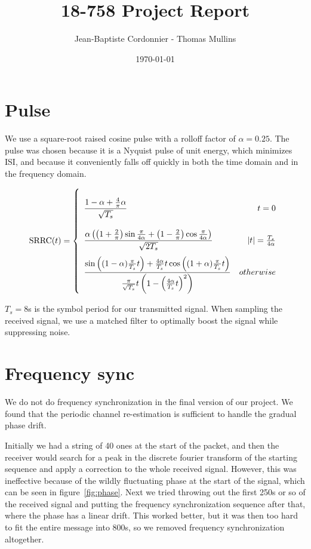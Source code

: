 \documentclass{article}
\begin{document}
\title{18-758 Project Report}
\author{Jean-Baptiste Cordonnier - Thomas Mullins}
\date{\today}
\maketitle


\section{Pulse}

We use a square-root raised cosine pulse with a rolloff factor of $\alpha =
0.25$. The pulse was chosen because it is a Nyquist pulse of unit energy, which
minimizes ISI, and because it conveniently falls off quickly in both the time
domain and in the frequency domain.

\[
  \text{SRRC}(t) = \left\{
    \def\arraystretch{3.2}
    \begin{array}{lr}
      \dfrac{1 - \alpha + \frac{4}{\pi}\alpha}{\sqrt{T_s}} & t = 0 \\
      \dfrac{\alpha \left(
        \left(1 + \frac{2}{\pi}\right) \sin{\frac{\pi}{4\alpha}} +
        \left(1 - \frac{2}{\pi}\right) \cos{\frac{\pi}{4\alpha}}
      \right)}{\sqrt{2T_s}} & |t| = \frac{T_s}{4\alpha} \\
      \dfrac{
        \sin{\left((1-\alpha)\frac{\pi}{T_s}t\right)} +
        \frac{4\alpha}{T_s}t\cos{\left((1+\alpha)\frac{\pi}{T_s}t\right)}
      }{
        \frac{\pi}{\sqrt{T_s}}t
        \left(1-\left(\frac{4\alpha}{T_s}t\right)^2\right)
      } & otherwise
    \end{array}
  \right.
\]

$T_s = 8$\textmu s is the symbol period for our transmitted signal. When
sampling the received signal, we use a matched filter to optimally boost the
signal while suppressing noise.

\section{Frequency sync}

We do not do frequency synchronization in the final version of our project. We
found that the periodic channel re-estimation is sufficient to handle the
gradual phase drift.

Initially we had a string of 40 ones at the start of the packet, and then the
receiver would search for a peak in the discrete fourier transform of the
starting sequence and apply a correction to the whole received signal. However,
this was ineffective because of the wildly fluctuating phase at the start of the
signal, which can be seen in figure~\ref{fig:phase}. Next we tried throwing out
the first 250\textmu s or so of the received signal and putting the frequency
synchronization sequence after that, where the phase has a linear drift. This
worked better, but it was then too hard to fit the entire message into
800\textmu s, so we removed frequency synchronization altogether.
\end{document}
